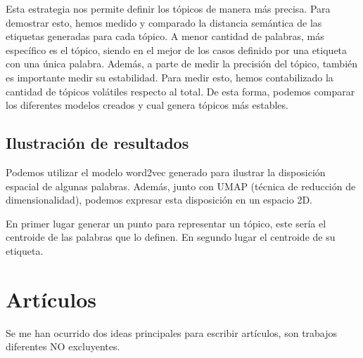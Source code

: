 \documentclass[a4paper,10pt]{article}
\begin{document}
Esta estrategia nos permite definir los tópicos de manera más precisa. Para demostrar esto, hemos medido y comparado la distancia semántica de las etiquetas generadas para cada tópico. A menor cantidad de palabras, más específico es el tópico, siendo en el mejor de los casos definido por una etiqueta con una única palabra. Además, a parte de medir la precisión del tópico, también es importante medir su estabilidad. Para medir esto, hemos contabilizado la cantidad de tópicos volátiles respecto al total. De esta forma, podemos comparar los diferentes modelos creados y cual genera tópicos más estables.









\subsection{Ilustración de resultados}

Podemos utilizar el modelo word2vec generado para ilustrar la disposición espacial de algunas palabras. Además, junto con UMAP (técnica de reducción de dimensionalidad), podemos expresar esta disposición en un espacio 2D.

En primer lugar generar un punto para representar un tópico, este sería el centroide de las palabras que lo definen. En segundo lugar el centroide de su etiqueta.


\section{Artículos}
Se me han ocurrido dos ideas principales para escribir artículos, son trabajos diferentes NO excluyentes.
\end{document}
